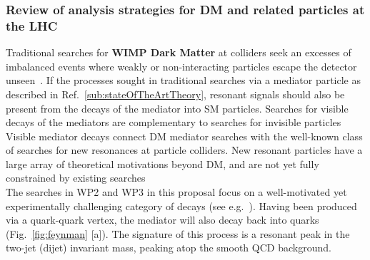 
\subsubsection{Review of analysis strategies for DM and related particles at the LHC}

Traditional searches for \textbf{WIMP Dark Matter} at colliders seek an excesses of imbalanced events where weakly or non-interacting particles escape the detector unseen~\cite{Boveia:2018yeb}. 
If the processes sought in traditional searches via a mediator particle as described in Ref.~\ref{sub:stateOfTheArtTheory}, 
resonant signals should also be present from the decays of the mediator into SM particles.
Searches for visible decays of the mediators are complementary to searches for invisible particles~\cite{CMSSummary,ATLASSummary}  
Visible mediator decays connect DM mediator searches with the well-known class of searches for new resonances at particle colliders. 
New resonant particles have a large array of theoretical motivations beyond DM, and are not yet fully constrained by existing searches~\cite{Kim:2019rhy}%
\\
\indent
The searches in WP2 and WP3 in this proposal focus on a well-motivated yet experimentally challenging category of decays (see e.g.~\cite{Chala:2015ama}). 
Having been produced via a quark-quark vertex, the mediator will also decay back into quarks (Fig.~\ref{fig:feynman} [a]). 
The signature of this process is a resonant peak in the two-jet (dijet) invariant mass, peaking atop the smooth QCD background.
